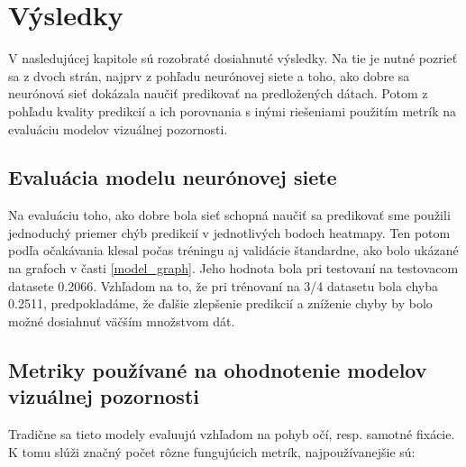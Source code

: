 \newpage
\section {Výsledky}
\label{results}
V nasledujúcej kapitole sú rozobraté dosiahnuté výsledky. Na tie je nutné pozrieť sa z dvoch strán, najprv z pohľadu neurónovej siete a toho, ako dobre sa neurónová sieť dokázala naučiť predikovať na predložených dátach. Potom z pohľadu kvality predikcií a ich porovnania s inými riešeniami použitím metrík na evaluáciu modelov vizuálnej pozornosti. 

\subsection{Evaluácia modelu neurónovej siete}
\label{evaluation}
Na evaluáciu toho, ako dobre bola sieť schopná naučiť sa predikovať sme použili jednoduchý priemer chýb predikcií v jednotlivých bodoch heatmapy.
Ten potom podľa očakávania klesal počas tréningu aj validácie štandardne, ako bolo ukázané na grafoch v časti \ref{model_graph}. Jeho hodnota bola pri testovaní na testovacom datasete 0.2066. Vzhľadom na to, že pri trénovaní na 3/4 datasetu bola chyba 0.2511, predpokladáme, že ďalšie zlepšenie predikcií a zníženie chyby by bolo možné dosiahnuť väčším množstvom dát.

\subsection{Metriky používané na ohodnotenie modelov vizuálnej pozornosti}
\label{metric}
Tradične sa tieto modely evaluujú vzhľadom na pohyb očí, resp. samotné fixácie. K tomu slúži značný počet rôzne fungujúcich metrík\cite{metriky}, najpoužívanejšie sú:

